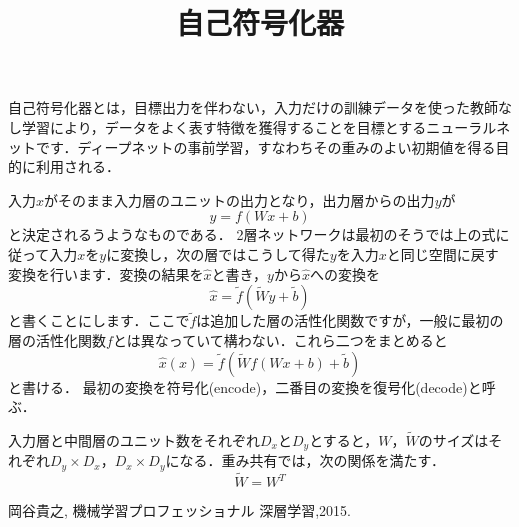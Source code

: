 \documentclass[12pt]{jsarticle}
\title{自己符号化器}
\begin{document}
自己符号化器とは，目標出力を伴わない，入力だけの訓練データを使った教師なし学習により，データをよく表す特徴を獲得することを目標とするニューラルネットです．ディープネットの事前学習，すなわちその重みのよい初期値を得る目的に利用される．

入力$x$がそのまま入力層のユニットの出力となり，出力層からの出力$y$が
\begin{equation}
  y = f(Wx+b)
\end{equation}
と決定されるうようなものである．
2層ネットワークは最初のそうでは上の式に従って入力$x$を$y$に変換し，次の層ではこうして得た$y$を入力$x$と同じ空間に戻す変換を行います．変換の結果を$\hat{x}$と書き，$y$から$\hat{x}$への変換を
\begin{equation}
  \hat{x} = \tilde{f}(\tilde{W}y+\tilde{b})
\end{equation}
と書くことにします．ここで$\tilde{f}$は追加した層の活性化関数ですが，一般に最初の層の活性化関数$f$とは異なっていて構わない．これら二つをまとめると\begin{equation}
  \hat{x}(x) = \tilde{f}(\tilde{W}f(Wx+b) + \tilde{b})
\end{equation}
と書ける．
最初の変換を符号化(encode)，二番目の変換を復号化(decode)と呼ぶ．

入力層と中間層のユニット数をそれぞれ$D_x$と$D_y$とすると，$W$，$\tilde{W}$のサイズはそれぞれ$D_y×D_x$，$D_x×D_y$になる．重み共有では，次の関係を満たす．
\begin{equation}
  \tilde{W} = W^T
\end{equation}


\begin{thebibliography}{9}
   岡谷貴之, 機械学習プロフェッショナル 深層学習,2015.
\end{thebibliography}
\end{document}
